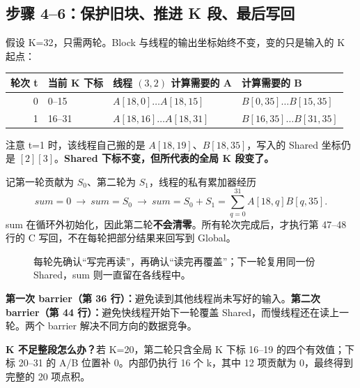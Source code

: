 \documentclass[UTF8,11pt,a4paper,fontset=fandol]{ctexart}
\begin{document}
\subsection{步骤 4--6：保护旧块、推进 K 段、最后写回}
假设 K=32，只需两轮。Block 与线程的输出坐标始终不变，变的只是输入的 K 起点：
\begin{table}[H]\centering\small
\begin{tabular}{rlll}
\toprule
轮次 t & 当前 K 下标 & 线程 $(3,2)$ 计算需要的 A & 计算需要的 B\\\midrule
0 & 0--15 & $A[18,0]\ldots A[18,15]$ & $B[0,35]\ldots B[15,35]$\\
1 & 16--31 & $A[18,16]\ldots A[18,31]$ & $B[16,35]\ldots B[31,35]$\\\bottomrule
\end{tabular}
\end{table}
注意 t=1 时，该线程自己搬的是 $A[18,19]$、$B[18,35]$，写入的 Shared 坐标仍是 $[2][3]$。\textbf{Shared 下标不变，但所代表的全局 K 段变了。}

记第一轮贡献为 $S_0$、第二轮为 $S_1$，线程的私有累加器经历
\[
sum=0\ \longrightarrow\ sum=S_0\ \longrightarrow\ sum=S_0+S_1
=\sum_{q=0}^{31}A[18,q]B[q,35].
\]
sum 在循环外初始化，因此第二轮\textbf{不会清零}。所有轮次完成后，才执行第 47--48 行的 C 写回，不在每轮把部分结果来回写到 Global。

\begin{figure}[H]\centering
{}
\caption{每轮先确认“写完再读”，再确认“读完再覆盖”；下一轮复用同一份 Shared，sum 则一直留在各线程中。}
\end{figure}

\textbf{第一次 barrier（第 36 行）：}避免读到其他线程尚未写好的输入。\textbf{第二次 barrier（第 44 行）：}避免快线程开始下一轮覆盖 Shared，而慢线程还在读上一轮。两个 barrier 解决不同方向的数据竞争。

\textbf{K 不足整段怎么办？}若 K=20，第二轮只含全局 K 下标 16--19 的四个有效值；下标 20--31 的 A/B 位置补 0。内部仍执行 16 个 k，其中 12 项贡献为 0，最终得到完整的 20 项点积。
\end{document}
